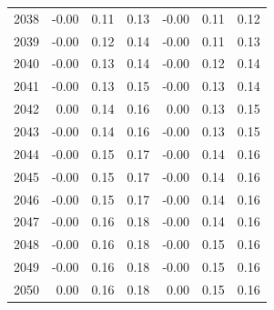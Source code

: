 \begin{table}
\begin{tabular}{lrrrrrr}
2038 & -0.00 & 0.11 & 0.13 & -0.00 & 0.11 & 0.12 \\
2039 & -0.00 & 0.12 & 0.14 & -0.00 & 0.11 & 0.13 \\
2040 & -0.00 & 0.13 & 0.14 & -0.00 & 0.12 & 0.14 \\
2041 & -0.00 & 0.13 & 0.15 & -0.00 & 0.13 & 0.14 \\
2042 & 0.00 & 0.14 & 0.16 & 0.00 & 0.13 & 0.15 \\
2043 & -0.00 & 0.14 & 0.16 & -0.00 & 0.13 & 0.15 \\
2044 & -0.00 & 0.15 & 0.17 & -0.00 & 0.14 & 0.16 \\
2045 & -0.00 & 0.15 & 0.17 & -0.00 & 0.14 & 0.16 \\
2046 & -0.00 & 0.15 & 0.17 & -0.00 & 0.14 & 0.16 \\
2047 & -0.00 & 0.16 & 0.18 & -0.00 & 0.14 & 0.16 \\
2048 & -0.00 & 0.16 & 0.18 & -0.00 & 0.15 & 0.16 \\
2049 & -0.00 & 0.16 & 0.18 & -0.00 & 0.15 & 0.16 \\
2050 & 0.00 & 0.16 & 0.18 & 0.00 & 0.15 & 0.16 \\
\bottomrule
\end{tabular}
\end{table}
